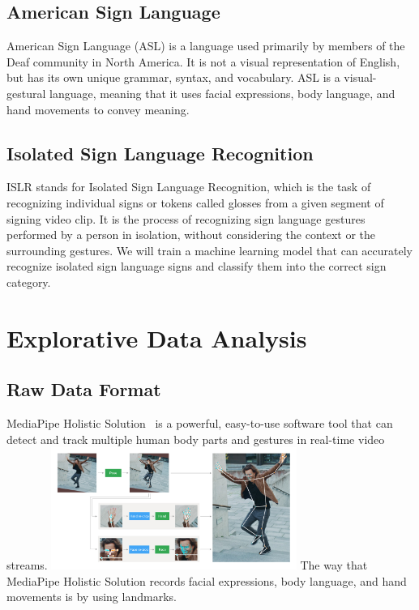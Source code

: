 \documentclass[10pt,twocolumn,letterpaper]{article}
\begin{document}
\begin{CJK*}{UTF8}{bsmi}
\subsection{American Sign Language}

American Sign Language (ASL) is a language used primarily by members of the Deaf community in North America. 
It is not a visual representation of English, but has its own unique grammar, syntax, and vocabulary. 
ASL is a visual-gestural language, meaning that it uses facial expressions, body language, and hand movements to convey meaning.

\subsection{Isolated Sign Language Recognition}

ISLR stands for Isolated Sign Language Recognition, which is the task of recognizing individual signs or tokens called glosses from a given segment of signing video clip.
It is the process of recognizing sign language gestures performed by a person in isolation, without considering the context or the surrounding gestures. 
We will train a machine learning model that can accurately recognize isolated sign language signs and classify them into the correct sign category.

\section{Explorative Data Analysis}
\label{sec:formatting}

\subsection{Raw Data Format}
MediaPipe Holistic Solution~\cite{https://doi.org/10.48550/arxiv.1906.08172} is a powerful, easy-to-use software tool that can detect and track multiple human body parts and gestures in real-time video streams. 
\includegraphics[width=80mm]{holistic_pipeline_example}
The way that MediaPipe Holistic Solution records facial expressions, body language, and hand movements is by using landmarks.


\end{CJK*}
\end{document}
